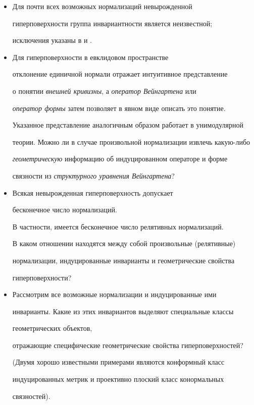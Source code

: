 \begin{itemize}


\item[(i)] Для почти всех возможных нормализаций невырожденной


гиперповерхности группа инвариантности является неизвестной;


исключения указаны в \cite{WIE} и \cite{BIN-W}.


\item[(ii)] Для гиперповерхности в евклидовом пространстве


отклонение единичной нормали отражает интуитивное представление


о понятии {\it внешней кривизны}, а {\it оператор Вейнгартена} или


{\it оператор формы} затем позволяет в явном виде описать это понятие.


Указанное представление аналогичным образом работает в унимодулярной


теории. Можно ли в случае произвольной нормализации извлечь какую-либо


{\it геометрическую} информацию об индуцированном операторе и форме


связности из {\it структурного уравнения Вейнгартена}?


\item[(iii)] Всякая невырожденная гиперповерхность допускает


бесконечное число нормализаций.


В частности, имеется бесконечное число релятивных нормализаций.


В каком отношении находятся между собой произвольные (релятивные)


нормализации, индуцированные инварианты и геометрические свойства


гиперповерхности?


\item[(iv)] Рассмотрим все возможные нормализации и индуцированные ими


инварианты. Какие из этих инвариантов выделяют специальные классы 


геометрических объектов,


отражающие специфические геометрические свойства гиперповерхностей?


(Двумя хорошо известными примерами являются конформный класс


индуцированных метрик и проективно плоский класс конормальных


связностей).


\end{itemize}





